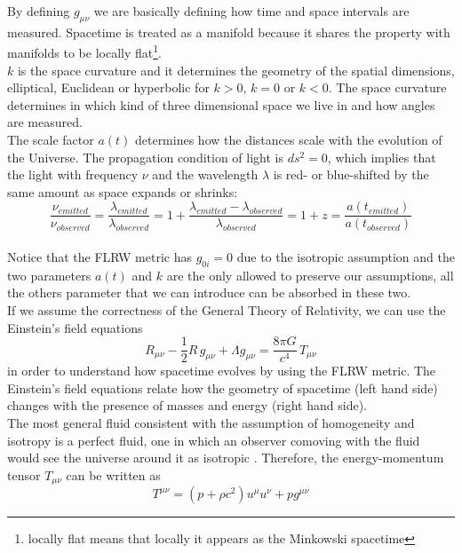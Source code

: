 \documentclass{article}
\begin{document}
By defining $g_{\mu \nu}$ we are basically  defining how time and space intervals are measured.
Spacetime is treated as a manifold because it shares the property with manifolds to be locally flat\footnote{locally flat means  that locally it appears as the Minkowski spacetime}.\\
$k$ is the space curvature and it determines the geometry of the spatial dimensions, elliptical, Euclidean or hyperbolic for $k>0$, $k=0$ or $k<0$.
The space curvature determines in which kind of three dimensional space we live in and how angles are measured.\\
The scale factor $a(t)$ determines how the distances scale with the evolution of the Universe.
The propagation condition of light is $ds^2 =0$, which implies that the light with frequency $\nu$ and the wavelength $\lambda$ is red- or blue-shifted by the same amount as space expands or shrinks:
\begin{equation}
\dfrac{\nu_{emitted}}{\nu_{observed}} = \dfrac{\lambda_{emitted}}{\lambda_{observed}} = 1 + \dfrac{\lambda_{emitted}-\lambda_{observed}}{\lambda_{observed}}=1+z= \dfrac{a(t_{emitted})}{a(t_{observed})}
\end{equation}
\\
Notice that the FLRW metric has $g_{0 i}=0$ due to the isotropic assumption and the two parameters $a(t)$ and $k$ are the only allowed to preserve our assumptions, all the others parameter that we can introduce can be absorbed in these two.
\\ %
If we assume the correctness of the General Theory of Relativity, we can use the Einstein's field equations
\begin{equation}
\label{einstein_eq}
R_{\mu \nu} - \dfrac{1}{2} R \, g _{\mu \nu} + \Lambda g_{\mu \nu}= \dfrac{8 \pi G}{c^4} \, T_{\mu \nu}
\end{equation}
in order to understand how spacetime evolves by using the FLRW metric.
The Einstein's field equations relate how the geometry of spacetime (left hand side) changes with the presence of masses and energy (right hand side).\\
The most general fluid consistent with the assumption of homogeneity and isotropy is a perfect fluid, one in which an observer comoving with the fluid would see the universe around it as isotropic \citep{garcia-bellidoAstrophysicsCosmology2000}. Therefore, the energy-momentum tensor $T_{\mu \nu}$ can be written as
\begin{equation}
\label{energy-momentum-tensor}
T^{\mu \nu } = (p + \rho c^2)u ^{\mu} u^{\nu}+p g^{\mu \nu} 
\end{equation}
\end{document}
